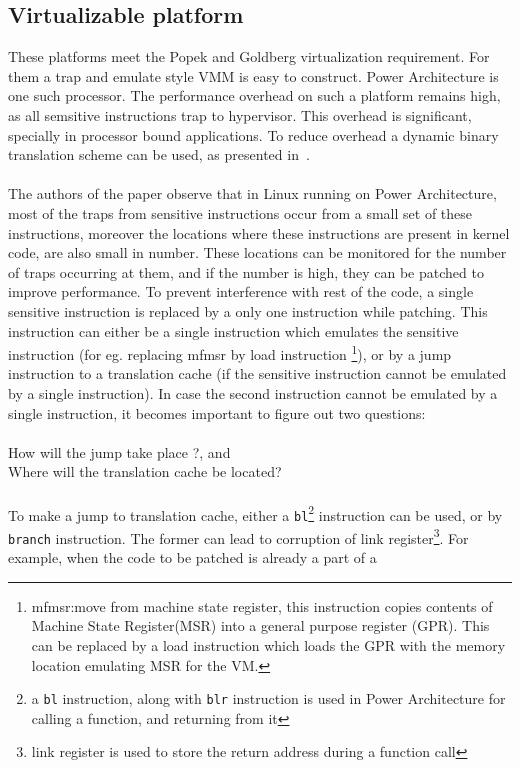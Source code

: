 \documentclass[seminar,twoside]{iitbreport}
\begin{document}
  \subsection{ Virtualizable platform }
  These platforms meet the Popek and Goldberg virtualization requirement. For them a trap and emulate style VMM is easy to construct.
  Power Architecture is one such processor. The performance overhead on such a platform remains high, as all semsitive instructions trap to hypervisor.
  This overhead is significant, specially in processor bound applications. To reduce overhead a dynamic binary translation scheme can be used, as presented in~\cite{Mittal:2013:EVE:2499368.2451163}.
  \\\\
  The authors of the paper observe that in Linux running on Power Architecture, most of the traps from sensitive instructions occur from a small set of these instructions, moreover 
  the locations where these instructions are present in kernel code, are also small in number. These locations can be monitored for the number of traps occurring at them,
  and if the number is high, they can be patched to improve performance. To prevent interference  with rest of the code, a single sensitive instruction is
  replaced by a only one instruction while patching. This instruction can either be a single instruction which emulates the sensitive instruction
  (for eg. replacing mfmsr by load instruction \footnote{mfmsr:move from machine state register, this instruction 
  copies contents of Machine State Register(MSR) into a general purpose register (GPR). This can be replaced by a load instruction which loads 
  the GPR with the memory location emulating MSR for the VM.}), or by a jump instruction to a translation cache (if the sensitive instruction cannot be emulated by a single instruction).
  In case the second instruction cannot be emulated by a single instruction, it becomes important to figure out two questions: 
  \\\\How will the jump take place ?, and
  \\
  Where will the translation cache be located?\\\\
  To make a jump to translation cache, either a \texttt{bl}\footnote{a \texttt{bl} instruction, along with \texttt{blr} instruction is used in Power Architecture for calling a function, and returning from it } instruction can be used, or by \texttt{branch}
  instruction. The former can lead to corruption of link register\footnote{link register is used to store the return address during a function call}. For example, when the code to be patched is already a part of a
\end{document}
